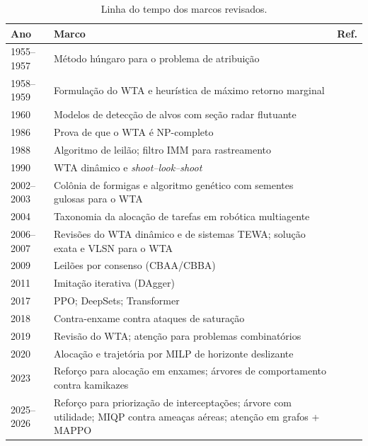 \begin{table}[t]
\centering
\caption{Linha do tempo dos marcos revisados.}
\label{tab:linha_tempo}
\small
\begin{tabularx}{\textwidth}{@{}l X l@{}}
\toprule
Ano & Marco & Ref. \\
\midrule
1955--1957 & Método húngaro para o problema de atribuição & \cite{kuhn1955,munkres1957} \\
1958--1959 & Formulação do WTA e heurística de máximo retorno marginal & \cite{manne1958,denbroeder1959} \\
1960 & Modelos de detecção de alvos com seção radar flutuante & \cite{swerling1960} \\
1986 & Prova de que o WTA é NP-completo & \cite{lloyd1986} \\
1988 & Algoritmo de leilão; filtro IMM para rastreamento & \cite{bertsekas1988,blom1988} \\
1990 & WTA dinâmico e \emph{shoot--look--shoot} & \cite{hosein1990} \\
2002--2003 & Colônia de formigas e algoritmo genético com sementes gulosas para o WTA & \cite{lee2002aco,lee2003ga} \\
2004 & Taxonomia da alocação de tarefas em robótica multiagente & \cite{gerkey2004} \\
2006--2007 & Revisões do WTA dinâmico e de sistemas TEWA; solução exata e VLSN para o WTA & \cite{cai2006,roux2007,ahuja2007} \\
2009 & Leilões por consenso (CBAA/CBBA) & \cite{choi2009} \\
2011 & Imitação iterativa (DAgger) & \cite{ross2011} \\
2017 & PPO; DeepSets; Transformer & \cite{schulman2017,zaheer2017,vaswani2017} \\
2018 & Contra-enxame contra ataques de saturação & \cite{strickland2018} \\
2019 & Revisão do WTA; atenção para problemas combinatórios & \cite{kline2019,kool2019} \\
2020 & Alocação e trajetória por MILP de horizonte deslizante & \cite{afonso2020} \\
2023 & Reforço para alocação em enxames; árvores de comportamento contra kamikazes & \cite{liu2023drones,ricardo2023} \\
2025--2026 & Reforço para priorização de interceptações; árvore com utilidade; MIQP contra ameaças aéreas; atenção em grafos + MAPPO & \cite{palmas2025,feitosa2025,cruz2025,jia2026} \\
\bottomrule
\end{tabularx}
\end{table}

